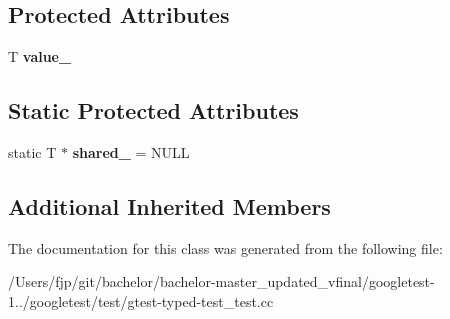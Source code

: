 \subsection*{Protected Attributes}
\begin{DoxyCompactItemize}
\item 
\mbox{\label{class_common_test_ae59c4abcb833625a7baeb2048531ebec}} 
T {\bfseries value\+\_\+}
\end{DoxyCompactItemize}
\subsection*{Static Protected Attributes}
\begin{DoxyCompactItemize}
\item 
\mbox{\label{class_common_test_a52368ce1e65a865db9bdccbcc2cedaac}} 
static T $\ast$ {\bfseries shared\+\_\+} = N\+U\+LL
\end{DoxyCompactItemize}
\subsection*{Additional Inherited Members}


The documentation for this class was generated from the following file\+:\begin{DoxyCompactItemize}
\item 
/\+Users/fjp/git/bachelor/bachelor-\/master\+\_\+updated\+\_\+vfinal/googletest-\/1../googletest/test/gtest-\/typed-\/test\+\_\+test.\+cc\end{DoxyCompactItemize}
